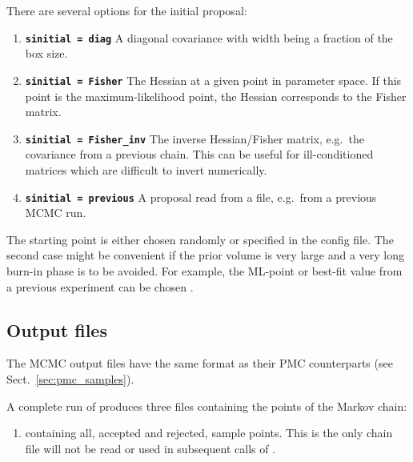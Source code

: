 \documentclass[11pt, chapterprefix, headsepline]{scrartcl}
\begin{document}
\begin{appendix}
There are several options for the initial proposal:

\begin{enumerate}

\item \textbf{\texttt{sinitial = diag}} A diagonal
covariance with width being a fraction of the box size.

\item \textbf{\texttt{sinitial = Fisher}} The
Hessian at a given point in parameter space. If this point is the
maximum-likelihood point, the Hessian corresponds to the Fisher
matrix.

\item \textbf{\texttt{sinitial = Fisher\_inv}} The inverse
  Hessian/Fisher matrix, e.g.~the covariance from a previous
  chain. This can be useful for ill-conditioned matrices which are
  difficult to invert numerically.

\item \textbf{\texttt{sinitial = previous}} A proposal read from a
  file, e.g.\ from a previous MCMC run.

\end{enumerate}


The starting point is either chosen randomly or specified in the
config file. The second case might be convenient if the prior volume
is very large and a very long burn-in phase is to be avoided. For
example, the ML-point or best-fit value from a previous experiment can
be chosen \cite{WMAP5-Dunkley08}.

\subsection{Output files}

The MCMC output files have the same format as their PMC counterparts (see Sect.~\ref{sec:pmc_samples}).

A complete run of  produces three files containing
the points of the Markov chain:

\begin{enumerate}
\item {} containing all, accepted and rejected, sample
  points. This is the only chain file will not be read or used in subsequent calls of
  .


\end{enumerate}
\end{appendix}
\end{document}
